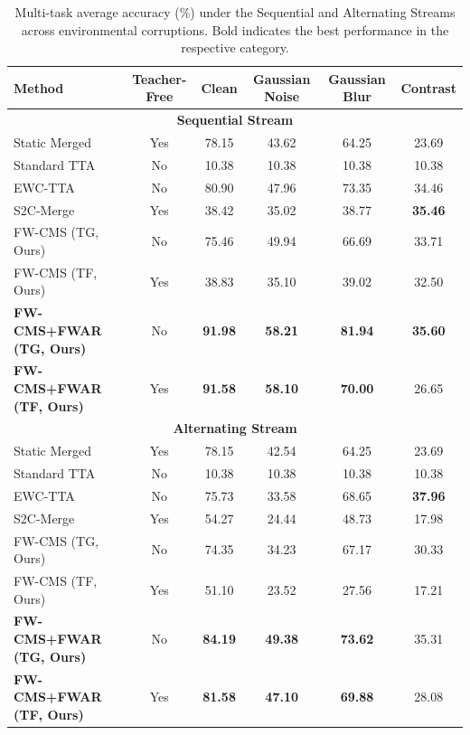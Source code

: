 \documentclass{article}
\begin{document}
\begin{table}[t]
\caption{Multi-task average accuracy (\%) under the Sequential and Alternating Streams across environmental corruptions. Bold indicates the best performance in the respective category.}
\label{tab:results}
\centering
\small
\begin{tabular}{lccccc}
\toprule
\textbf{Method} & \textbf{Teacher-Free} & \textbf{Clean} & \textbf{Gaussian Noise} & \textbf{Gaussian Blur} & \textbf{Contrast} \\
\midrule
\multicolumn{6}{c}{\textbf{Sequential Stream}} \\
\midrule
Static Merged & Yes & 78.15 & 43.62 & 64.25 & 23.69 \\
Standard TTA & No & 10.38 & 10.38 & 10.38 & 10.38 \\
EWC-TTA & No & 80.90 & 47.96 & 73.35 & 34.46 \\
S2C-Merge & Yes & 38.42 & 35.02 & 38.77 & \textbf{35.46} \\
\midrule
FW-CMS (TG, Ours) & No & 75.46 & 49.94 & 66.69 & 33.71 \\
FW-CMS (TF, Ours) & Yes & 38.83 & 35.10 & 39.02 & 32.50 \\
\textbf{FW-CMS+FWAR (TG, Ours)} & No & \textbf{91.98} & \textbf{58.21} & \textbf{81.94} & \textbf{35.60} \\
\textbf{FW-CMS+FWAR (TF, Ours)} & Yes & \textbf{91.58} & \textbf{58.10} & \textbf{70.00} & 26.65 \\
\midrule
\multicolumn{6}{c}{\textbf{Alternating Stream}} \\
\midrule
Static Merged & Yes & 78.15 & 42.54 & 64.25 & 23.69 \\
Standard TTA & No & 10.38 & 10.38 & 10.38 & 10.38 \\
EWC-TTA & No & 75.73 & 33.58 & 68.65 & \textbf{37.96} \\
S2C-Merge & Yes & 54.27 & 24.44 & 48.73 & 17.98 \\
\midrule
FW-CMS (TG, Ours) & No & 74.35 & 34.23 & 67.17 & 30.33 \\
FW-CMS (TF, Ours) & Yes & 51.10 & 23.52 & 27.56 & 17.21 \\
\textbf{FW-CMS+FWAR (TG, Ours)} & No & \textbf{84.19} & \textbf{49.38} & \textbf{73.62} & 35.31 \\
\textbf{FW-CMS+FWAR (TF, Ours)} & Yes & \textbf{81.58} & \textbf{47.10} & \textbf{69.88} & 28.08 \\
\bottomrule
\end{tabular}
\end{table}
\end{document}

